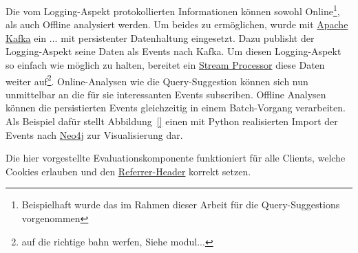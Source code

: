 Die vom Logging-Aspekt protokollierten Informationen können sowohl
Online\footnote{Beispielhaft wurde das im Rahmen dieser Arbeit für die Query-Suggestions vorgenommen},
als auch Offline analysiert werden.
Um beides zu ermöglichen, wurde mit \href{https://kafka.apache.org/}{Apache Kafka}
ein ... mit persistenter Datenhaltung eingesetzt.
Dazu publisht der Logging-Aspekt seine Daten als Events nach Kafka.
Um diesen Logging-Aspekt so einfach wie möglich zu halten, bereitet ein
\href{https://www.confluent.io/blog/introducing-kafka-streams-stream-processing-made-simple/}{Stream Processor}
diese Daten weiter auf\footnote{auf die richtige bahn werfen, Siehe modul...}.
Online-Analysen wie die Query-Suggestion können sich nun unmittelbar an die für sie interessanten Events subscriben.
Offline Analysen können die persistierten Events gleichzeitig in einem  Batch-Vorgang verarbeiten.
Als Beispiel dafür stellt Abbildung~\ref{} einen mit Python realisierten
Import der Events nach \href{https://de.wikipedia.org/wiki/Neo4j}{Neo4j} zur Visualisierung dar.

Die hier vorgestellte Evaluationskomponente funktioniert für alle Clients, welche Cookies erlauben und den \href{}{Referrer-Header}
korrekt setzen.
